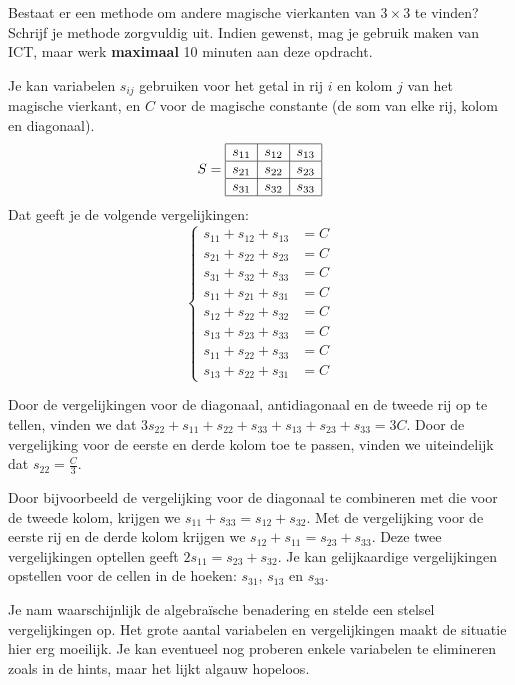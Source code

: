 \documentclass{ximera}
\begin{document}
\begin{exercise}
    Bestaat er een methode om andere magische vierkanten van \(3 \times 3\) te vinden?
    Schrijf je methode zorgvuldig uit.
    Indien gewenst, mag je gebruik maken van ICT, maar werk \textbf{maximaal} 10 minuten aan deze opdracht.
    \begin{hint}
        Je kan variabelen \(s_{ij}\) gebruiken voor het getal in rij \(i\) en kolom \(j\) van het magische vierkant, en \(C\) voor de magische constante (de som van elke rij, kolom en diagonaal).
        \[
        S=
        \begin{array}{|c|c|c|}
        \hline
        s_{11} & s_{12} & s_{13} \\
        \hline
        s_{21} & s_{22} &  s_{23}\\
        \hline
        s_{31} & s_{32} & s_{33} \\
        \hline
        \end{array}
        \]
        Dat geeft je de volgende vergelijkingen:
        \[
        \begin{cases}
        s_{11} + s_{12} + s_{13} &= C \\
        s_{21} + s_{22} + s_{23} &= C \\
        s_{31} + s_{32} + s_{33} &= C \\
        s_{11} + s_{21} + s_{31} &= C \\
        s_{12} + s_{22} + s_{32} &= C \\
        s_{13} + s_{23} + s_{33} &= C \\
        s_{11} + s_{22} + s_{33} &= C \\
        s_{13} + s_{22} + s_{31} &= C
        \end{cases}
        \]
    \end{hint}
    \begin{hint}
    Door de vergelijkingen voor de diagonaal, antidiagonaal en de tweede rij op te tellen, vinden we dat \(3s_{22}+s_{11}+s_{22}+s_{33}+s_{13}+s_{23}+s_{33}=3C\).
    Door de vergelijking voor de eerste en derde kolom toe te passen, vinden we uiteindelijk dat \(s_{22}=\frac{C}{3}\).
    \end{hint}
    \begin{hint}
        Door bijvoorbeeld de vergelijking voor de diagonaal te combineren met die voor de tweede kolom, krijgen we \(s_{11} + s_{33} = s_{12} + s_{32}\).
        Met de vergelijking voor de eerste rij en de derde kolom krijgen we \(s_{12} + s_{11} = s_{23} + s_{33}\).
        Deze twee vergelijkingen optellen geeft \(2s_{11} = s_{23} + s_{32}\).
        Je kan gelijkaardige vergelijkingen opstellen voor de cellen in de hoeken: \(s_{31}\), \(s_{13}\) en \(s_{33}\).
    \end{hint}
    \begin{oplossing}
        Je nam waarschijnlijk de algebraïsche benadering en stelde een stelsel vergelijkingen op.
        Het grote aantal variabelen en vergelijkingen maakt de situatie hier erg moeilijk.
        Je kan eventueel nog proberen enkele variabelen te elimineren zoals in de hints, maar het lijkt algauw hopeloos.\newline


\end{oplossing}
\end{exercise}
\end{document}
